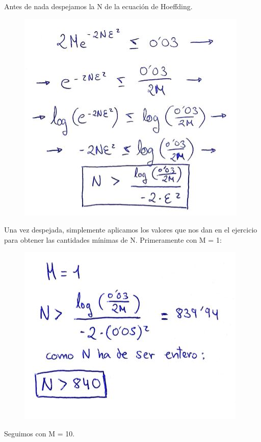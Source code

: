 Antes de nada despejamos la N de la ecuación de Hoeffding.
\begin{figure}[H] %
	\centering
	\includegraphics[scale=0.80]{imagenes/1} 
\end{figure}

Una vez despejada, simplemente aplicamos los valores que nos dan en el ejercicio para obtener las cantidades mínimas de N.
Primeramente con M = 1:

\begin{figure}[H] %
	\centering
	\includegraphics[scale=0.80]{imagenes/2} 
\end{figure}

Seguimos con M = 10.

